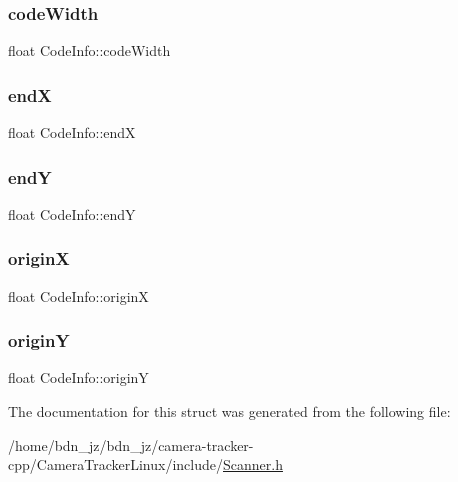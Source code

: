 \mbox{\label{struct_code_info_ab8493ec1c1f670d1060bde6c261f9e80}} 
\subsubsection{\texorpdfstring{code\+Width}{codeWidth}}
{\footnotesize\ttfamily float Code\+Info\+::code\+Width}

\mbox{\label{struct_code_info_afcbf3d398415769aba6f875c29395ec7}} 
\subsubsection{\texorpdfstring{endX}{endX}}
{\footnotesize\ttfamily float Code\+Info\+::endX}

\mbox{\label{struct_code_info_a8d3d91e8e32d9294b514950029755841}} 
\subsubsection{\texorpdfstring{endY}{endY}}
{\footnotesize\ttfamily float Code\+Info\+::endY}

\mbox{\label{struct_code_info_aaf7a04108a44c795809b1c0322f53a9b}} 
\subsubsection{\texorpdfstring{originX}{originX}}
{\footnotesize\ttfamily float Code\+Info\+::originX}

\mbox{\label{struct_code_info_aa4dab88d16276786b4556f021fd192f7}} 
\subsubsection{\texorpdfstring{originY}{originY}}
{\footnotesize\ttfamily float Code\+Info\+::originY}



The documentation for this struct was generated from the following file\+:\begin{DoxyCompactItemize}
\item 
/home/bdn\+\_\+jz/bdn\+\_\+jz/camera-\/tracker-\/cpp/\+Camera\+Tracker\+Linux/include/\hyperlink{_scanner_8h}{Scanner.\+h}\end{DoxyCompactItemize}
